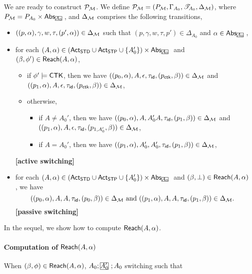We are ready to construct ${\mathcal{P} }_{\mathcal{M} }$. 
We define ${\mathcal{P} }_{{\mathcal{M} }} = (P_{{\mathcal{M} }}, \Gamma_{A_0}, {\mathscr{T} }_{A_0}, \Delta_{{\mathcal{M} }})$, where $P_{\Mm} = P_{A_0} \times \abs_{\mhcancel{A_0}}$, and $\Delta_{{\mathcal{M} }}$ comprises the following transitions,
\begin{itemize}
    \item $((p, \alpha), \gamma, w, \tau, (p', \alpha)) \in \Delta_{{\mathcal{M} }}$ such that $(p, \gamma, w, \tau, p') \in \Delta_{A_0}$ and $\alpha\in\abs_{\mhcancel{A_0}}$,
    \item for each $(A, \alpha) \in (\act_{\standard} \cup \act_{\singletop} \cup \{A_0'\}) \times \abs_{\mhcancel{A_0}}$ and $(\beta,\phi')\in{\sf Reach}(A,\alpha)$, 
        \begin{itemize}
            \item if $\phi' \models {\sf CTK}$, then we have $((p_0, \alpha), A, \epsilon, \tau_{\mathsf{id}}, (p_{\sf ctk}, \beta)) \in \Delta_{{\mathcal{M} }}$ and $((p_1, \alpha), A, \epsilon, \tau_{\mathsf{id}}, (p_{\sf ctk}, \beta)) \in \Delta_{{\mathcal{M} }}$,
            \item otherwise,
            \begin{itemize}
                \item if $A\neq A_0'$, then we have
                    $((p_0, \alpha), A, A_0'A, \tau_{\mathsf{id}}, (p_1, \beta)) \in \Delta_{{\mathcal{M} }}$ and $((p_1, \alpha), A, \epsilon, \tau_{\mathsf{id}}, (p_{1, A'_0}, \beta)) \in \Delta_{{\mathcal{M} }}$,
                \item if $A=A_0'$, then we have $((p_1, \alpha), A_0', A_0', \tau_{\mathsf{id}}, (p_1, \beta)) \in \Delta_{{\mathcal{M} }}$,
            \end{itemize}
        \end{itemize}
                \textbf{[active switching]}
    \item for each $(A,\alpha) \in (\act_{\standard} \cup \act_{\singletop} \cup \{A_0'\}) \times \abs_{\mhcancel{A_0}}$ and $(\beta,\bot)\in{\sf Reach}(A,\alpha)$, we have 
    $$((p_0, \alpha), A, A, \tau_{\mathsf{id}}, (p_0, \beta)) \in \Delta_{{\mathcal{M} }} \mbox{ and } ((p_1, \alpha), A, A, \tau_{\mathsf{id}}, (p_1, \beta)) \in \Delta_{{\mathcal{M} }}.$$
            \textbf{[passive switching]}
\end{itemize}

In the sequel, we show how to compute ${\sf Reach}(A, \alpha)$. 

\paragraph*{Computation of ${\sf Reach}(A, \alpha)$}
When $(\beta, \phi) \in {\sf Reach}(A, \alpha)$,  $A_0; \mhcancel{A'_0}; A_0$ switching such that
  
